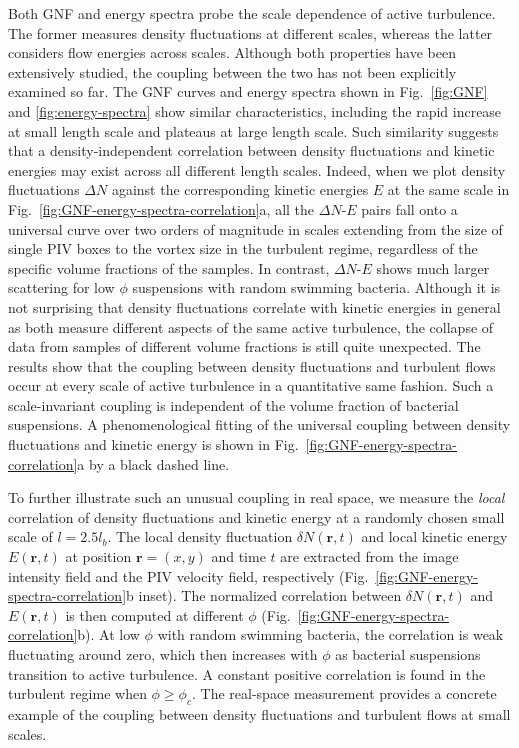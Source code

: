Both GNF and energy spectra probe the scale dependence of active turbulence. The former measures density fluctuations at different scales, whereas the latter considers flow energies across scales. Although both properties have been extensively studied, the coupling between the two has not been explicitly examined so far.
The GNF curves and energy spectra shown in Fig.~\ref{fig:GNF} and \ref{fig:energy-spectra} show similar characteristics, including the rapid increase at small length scale and plateaus at large length scale. Such similarity suggests that a density-independent correlation between density fluctuations and kinetic energies may exist across all different length scales.
Indeed, when we plot density fluctuations $\Delta N$ against the corresponding kinetic energies $E$ at the same scale in Fig.~\ref{fig:GNF-energy-spectra-correlation}a, all the $\Delta N$-$E$ pairs fall onto a universal curve over two orders of magnitude in scales extending from the size of single PIV boxes to the vortex size in the turbulent regime, regardless of the specific volume fractions of the samples.
In contrast, $\Delta N$-$E$ shows much larger scattering for low $\phi$ suspensions with random swimming bacteria.
Although it is not surprising that density fluctuations correlate with kinetic energies in general as both measure different aspects of the same active turbulence, the collapse of data from samples of different volume fractions is still quite unexpected.
The results show that the coupling between density fluctuations and turbulent flows occur at every scale of active turbulence in a quantitative same fashion. Such a scale-invariant coupling is independent of the volume fraction of bacterial suspensions. A phenomenological fitting of the universal coupling between density fluctuations and kinetic energy is shown in Fig.~\ref{fig:GNF-energy-spectra-correlation}a by a black dashed line.

To further illustrate such an unusual coupling in real space, we measure the \emph{local} correlation of density fluctuations and kinetic energy at a randomly chosen small scale of $l = 2.5l_b$. The local density fluctuation $\delta N(\mathbf{r},t)$ and local kinetic energy $E(\mathbf{r},t)$ at position $\mathbf{r} = (x,y)$ and time $t$ are extracted from the image intensity field and the PIV velocity field, respectively (Fig.~\ref{fig:GNF-energy-spectra-correlation}b inset).
The normalized correlation between $\delta N(\mathbf{r},t)$ and $E(\mathbf{r},t)$ is then computed at different $\phi$ (Fig.~\ref{fig:GNF-energy-spectra-correlation}b). At low $\phi$ with random swimming bacteria, the correlation is weak fluctuating around zero, which then increases with $\phi$ as bacterial suspensions transition to active turbulence. A constant positive correlation is found in the turbulent regime when $\phi \geq \phi_c$. The real-space measurement provides a concrete example of the coupling between density fluctuations and turbulent flows at small scales.

